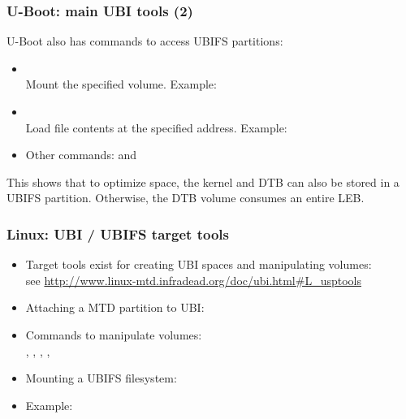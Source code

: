 \begin{frame}
  \frametitle{U-Boot: main UBI tools (2)}
  U-Boot also has commands to access UBIFS partitions:
    \begin{itemize}
    \item {}\\
	Mount the specified volume. Example:\\
    \item {}\\
	Load file contents at the specified address. Example:\\
    \item Other commands:  and 
    \end{itemize}
    This shows that to optimize space, the kernel and DTB can
    also be stored in a UBIFS partition. Otherwise, the DTB volume
    consumes an entire LEB.
\end{frame}

\begin{frame}
  \frametitle{Linux: UBI / UBIFS target tools}
  \begin{itemize}
  \item Target tools exist for creating UBI spaces and manipulating volumes:\\
    see \url{http://www.linux-mtd.infradead.org/doc/ubi.html\#L_usptools}
  \item Attaching a MTD partition to UBI:\\
  \item Commands to manipulate volumes:\\ ,
    , , ,
  \item Mounting a UBIFS filesystem:\\
  \item Example:\\
  \end{itemize}
\end{frame}

